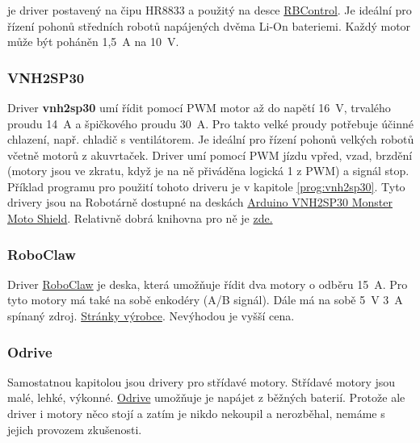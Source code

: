  \subsubsection{} %
 

\href{}{} je  driver postavený na čipu HR8833 a použitý na desce \hyperref[rbcontrol]{RBControl}. 
Je ideální pro řízení pohonů středních robotů napájených dvěma Li-On bateriemi. 
Každý motor může být poháněn 1,5~A na 10~V. 

 
 
 
\label{vnh2sp30} \subsubsection{VNH2SP30}
 
 Driver {\bf vnh2sp30}  umí řídit pomocí PWM motor až do napětí 16~V, trvalého proudu 14~A a špičkového proudu 30~A. Pro takto velké proudy potřebuje účinné chlazení, např. chladič s ventilátorem. Je ideální pro řízení pohonů velkých robotů včetně motorů z akuvrtaček. 
 Driver umí pomocí PWM jízdu vpřed, vzad, brzdění (motory jsou ve zkratu, když je na ně přiváděna logická 1 z PWM) a signál stop. 
 Příklad programu pro použití tohoto driveru je v kapitole \ref{prog:vnh2sp30}. 
  Tyto drivery jsou na Robotárně dostupné na deskách \href{https://github.com/sparkfun/Monster_Moto_Shield}{Arduino VNH2SP30 Monster Moto Shield}.
  Relativně dobrá knihovna pro ně je \href{ https://github.com/OliviliK/Arduino-Robot/tree/master/libraries/Vnh2sp30}{zde.} 
 
 
\subsubsection{RoboClaw}

Driver \href{https://www.pololu.com/product/3285}{RoboClaw} je deska, která umožňuje řídit dva motory o odběru 15~A. 
Pro tyto motory má také na sobě enkodéry (A/B signál). 
Dále má na sobě 5~V 3~A spínaný zdroj.
\href{http://www.ionmc.com/RoboClaw-2x15A-Motor-Controller_p_10.html}{Stránky výrobce}.
Nevýhodou je vyšší cena. 

\subsubsection{Odrive} 

Samostatnou kapitolou jsou drivery pro střídavé motory. 
Střídavé motory jsou malé, lehké, výkonné. 
\href{https://odriverobotics.com }{Odrive} umožňuje je napájet z běžných baterií. 
Protože ale driver i motory něco stojí  a zatím je nikdo nekoupil a nerozběhal, nemáme s jejich provozem zkušenosti. 


